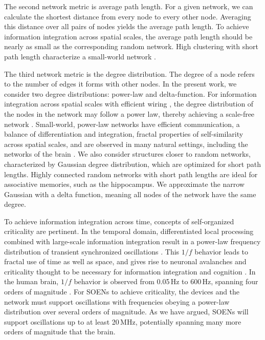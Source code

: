 \documentclass[aip,amsmath,amssymb,reprint,nofootinbib]{revtex4-1}
\begin{document}
The second network metric is average path length. For a given network, we can calculate the shortest distance from every node to every other node. Averaging this distance over all pairs of nodes yields the average path length. To achieve information integration across spatial scales, the average path length should be nearly as small as the corresponding random network. High clustering with short path length characterize a small-world network \cite{wast1998}. 

The third network metric is the degree distribution. The degree of a node refers to the number of edges it forms with other nodes. In the present work, we consider two degree distributions: power-law and delta-function. For information integration across spatial scales with efficient wiring \cite{busp2012}, the degree distribution of the nodes in the network may follow a power law, thereby achieving a scale-free network \cite{baal1999}. Small-world, power-law networks have efficient communication, a balance of differentiation and integration, fractal properties of self-similarity across spatial scales, and are observed in many natural settings, including the networks of the brain \cite{egch2005}. We also consider structures closer to random networks, characterized by Gaussian degree distribution, which are optimized for short path lengths. Highly connected random networks with short path lengths are ideal for associative memories, such as the hippocampus. We approximate the narrow Gaussian with a delta function, meaning all nodes of the network have the same degree. 

To achieve information integration across time, concepts of self-organized criticality \cite{bata1987,yara2017} are pertinent. In the temporal domain, differentiated local processing combined with large-scale information integration result in a power-law frequency distribution of transient synchronized oscillations \cite{budr2004,bu2006}. This $1/f$ behavior leads to fractal use of time as well as space, and gives rise to neuronal avalanches \cite{be2007} and criticality thought to be necessary for information integration and cognition \cite{be2007,kism2009,shya2009,rusp2011}. In the human brain, $1/f$ behavior is observed from 0.05\,Hz to 600\,Hz, spanning four orders of magnitude \cite{budr2004,bu2006}. For SOENs to achieve criticality, the devices and the network must support oscillations with frequencies obeying a power-law distribution \cite{bu2006} over several orders of magnitude. As we have argued, SOENs will support oscillations up to at least 20\,MHz, potentially spanning many more orders of magnitude that the brain. 
\end{document}
